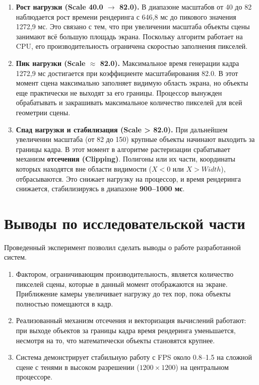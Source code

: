 \begin{enumerate}
	\item\textbf{Рост нагрузки (Scale 40.0 $\to$ 82.0).}
	В диапазоне масштабов от 40 до 82 наблюдается рост времени рендеринга с 646,8 мс до пикового значения 1272,9 мс. Это связано с тем, что при увеличении масштаба объекты сцены занимают всё большую площадь экрана. Поскольку алгоритм работает на CPU, его производительность ограничена скоростью заполнения пикселей.
	
	\item\textbf{Пик нагрузки (Scale $\approx$ 82.0).}
	Максимальное время генерации кадра 1272,9 мс достигается при коэффициенте масштабирования 82.0. В этот момент сцена максимально заполняет видимую область экрана, но объекты еще практически не выходят за его границы. Процессор вынужден обрабатывать и закрашивать максимальное количество пикселей для всей геометрии сцены.
	
	\item\textbf{Спад нагрузки и стабилизация (Scale > 82.0).}
	При дальнейшем увеличении масштаба (от 82 до 150) крупные объекты начинают выходить за границы кадра. В этот момент в алгоритме растеризации срабатывает механизм \textbf{отсечения (Clipping)}. Полигоны или их части, координаты которых находятся вне области видимости ($X < 0$ или $X > Width$), отбрасываются. Это снижает нагрузку на процессор, и время рендеринга снижается, стабилизируясь в диапазоне \textbf{900–1000 мс}.
\end{enumerate}

\section{Выводы по исследовательской части}

Проведенный эксперимент позволил сделать выводы о работе разработанной систем.

\begin{enumerate}
	\item Фактором, ограничивающим производительность, является количество пикселей сцены, которые в данный момент отображаются на экране. Приближение камеры увеличивает нагрузку до тех пор, пока объекты полностью помещаются в кадр.
	\item Реализованный механизм отсечения и векторизация вычислений работают: при выходе объектов за границы кадра время рендеринга уменьшается, несмотря на то, что математически объекты становятся крупнее.
	\item Система демонстрирует стабильную работу с FPS около 0.8–1.5 на сложной сцене с тенями в высоком разрешении ($1200 \times 1200$) на центральном процессоре.
\end{enumerate}